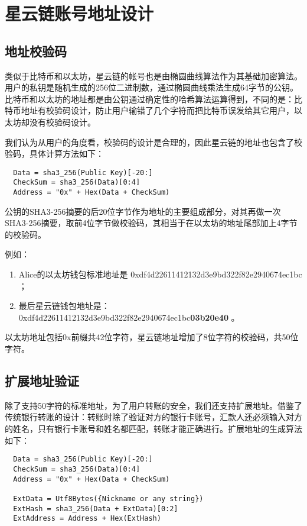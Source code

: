 \section{星云链账号地址设计}

\subsection{地址校验码}
类似于比特币和以太坊，星云链的帐号也是由椭圆曲线算法作为其基础加密算法。
用户的私钥是随机生成的256位二进制数，通过椭圆曲线乘法生成64字节的公钥。
比特币和以太坊的地址都是由公钥通过确定性的哈希算法运算得到，不同的是：比特币地址有校验码设计，防止用户输错了几个字符而把比特币误发给其它用户，以太坊却没有校验码设计。

我们认为从用户的角度看，校验码的设计是合理的，因此星云链的地址也包含了校验码，具体计算方法如下：

\begin{verbatim}
  Data = sha3_256(Public Key)[-20:]
  CheckSum = sha3_256(Data)[0:4]
  Address = "0x" + Hex(Data + CheckSum)
\end{verbatim}

公钥的SHA3-256摘要的后20位字节作为地址的主要组成部分，对其再做一次SHA3-256摘要，取前4位字节做校验码，其相当于在以太坊的地址尾部加上4字节的校验码。

例如：
\begin{enumerate}
  \item Alice的以太坊钱包标准地址是 0xdf4d22611412132d3e9bd322f82e2940674ec1bc ；
  \item 最后星云链钱包地址是： 0xdf4d22611412132d3e9bd322f82e2940674ec1bc\textbf{03b20e40} 。
\end{enumerate}

以太坊地址包括0x前缀共42位字符，星云链地址增加了8位字符的校验码，共50位字符。

\subsection{扩展地址验证}
除了支持50字符的标准地址，为了用户转账的安全，我们还支持扩展地址。借鉴了传统银行转账的设计：转账时除了验证对方的银行卡账号，汇款人还必须输入对方的姓名，只有银行卡账号和姓名都匹配，转账才能正确进行。扩展地址的生成算法如下：

\begin{verbatim}
  Data = sha3_256(Public Key)[-20:]
  CheckSum = sha3_256(Data)[0:4]
  Address = "0x" + Hex(Data + CheckSum)

  ExtData = Utf8Bytes({Nickname or any string})
  ExtHash = sha3_256(Data + ExtData)[0:2]
  ExtAddress = Address + Hex(ExtHash)
\end{verbatim}


